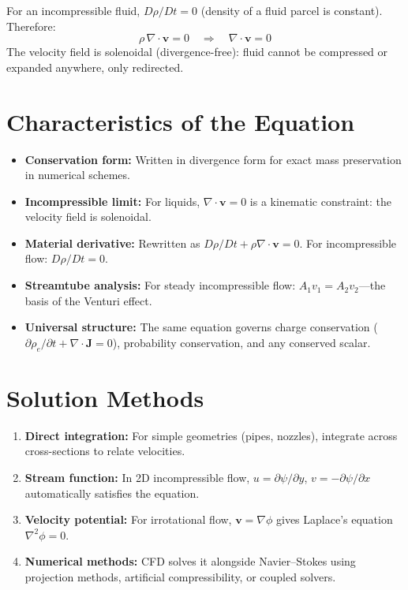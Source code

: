 For an incompressible fluid, $D\rho/Dt = 0$ (density of a fluid parcel is constant). Therefore:
\begin{equation}
\rho\,\nabla \cdot \mathbf{v} = 0 \quad\Longrightarrow\quad \boxed{\nabla \cdot \mathbf{v} = 0}
\end{equation}
The velocity field is solenoidal (divergence-free): fluid cannot be compressed or expanded anywhere, only redirected.

\section*{Characteristics of the Equation}

\begin{itemize}
\item \textbf{Conservation form:} Written in divergence form for exact mass preservation in numerical schemes.
\item \textbf{Incompressible limit:} For liquids, $\nabla \cdot \mathbf{v} = 0$ is a kinematic constraint: the velocity field is solenoidal.
\item \textbf{Material derivative:} Rewritten as $D\rho/Dt + \rho \nabla \cdot \mathbf{v} = 0$. For incompressible flow: $D\rho/Dt = 0$.
\item \textbf{Streamtube analysis:} For steady incompressible flow: $A_1 v_1 = A_2 v_2$---the basis of the Venturi effect.
\item \textbf{Universal structure:} The same equation governs charge conservation ($\partial \rho_e / \partial t + \nabla \cdot \mathbf{J} = 0$), probability conservation, and any conserved scalar.
\end{itemize}
\section*{Solution Methods}

\begin{enumerate}
\item \textbf{Direct integration:} For simple geometries (pipes, nozzles), integrate across cross-sections to relate velocities.
\item \textbf{Stream function:} In 2D incompressible flow, $u = \partial\psi/\partial y$, $v = -\partial\psi/\partial x$ automatically satisfies the equation.
\item \textbf{Velocity potential:} For irrotational flow, $\mathbf{v} = \nabla\phi$ gives Laplace's equation $\nabla^2 \phi = 0$.
\item \textbf{Numerical methods:} CFD solves it alongside Navier--Stokes using projection methods, artificial compressibility, or coupled solvers.
\end{enumerate}
